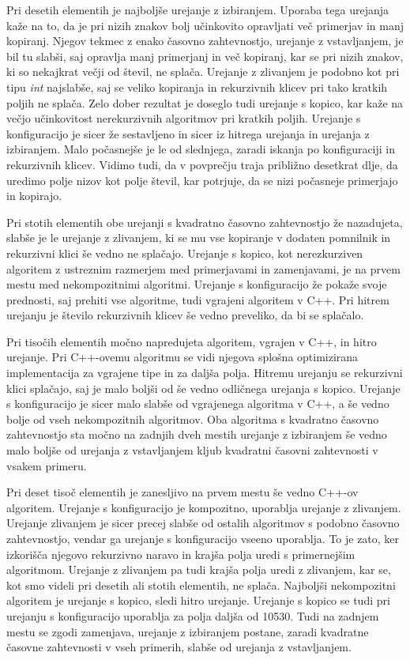 \documentclass[a4paper,oneside,12pt]{article}
\begin{document}
Pri desetih elementih je najboljše urejanje z izbiranjem.
Uporaba tega urejanja kaže na to, da je pri nizih znakov bolj učinkovito opravljati več
primerjav in manj kopiranj. Njegov tekmec z enako časovno zahtevnostjo, urejanje z 
vstavljanjem, je bil tu slabši, saj opravlja manj primerjanj in več kopiranj, kar se pri
nizih znakov, ki so nekajkrat večji od števil, ne splača. Urejanje z zlivanjem je podobno
kot pri tipu \emph{int} najslabše, saj se veliko kopiranja in rekurzivnih klicev pri tako 
kratkih poljih ne splača. Zelo dober rezultat je doseglo tudi urejanje s kopico, kar kaže 
na večjo učinkovitost nerekurzivnih algoritmov pri kratkih poljih. Urejanje s konfiguracijo
je sicer že sestavljeno in sicer iz hitrega urejanja in urejanja z izbiranjem. Malo počasnejše 
je le od slednjega, zaradi iskanja po konfiguraciji in rekurzivnih klicev.
Vidimo tudi, da v povprečju traja približno desetkrat dlje, da uredimo polje nizov kot polje števil,
kar potrjuje, da se nizi počasneje primerjajo in kopirajo.

Pri stotih elementih obe urejanji s kvadratno časovno zahtevnostjo že nazadujeta, slabše je le urejanje z zlivanjem,
ki se mu vse kopiranje v dodaten pomnilnik in rekurzivni klici 
še vedno ne splačajo. Urejanje s kopico, kot nerezkurziven algoritem
z ustreznim razmerjem med primerjavami in zamenjavami, je na prvem mestu med nekompozitnimi algoritmi.
Urejanje s konfiguracijo že pokaže svoje prednosti, saj prehiti vse algoritme, tudi vgrajeni 
algoritem v C++. Pri hitrem urejanju je število rekurzivnih klicev še vedno preveliko, da bi se splačalo.

Pri tisočih elementih močno napredujeta algoritem, vgrajen v C++, in hitro urejanje. Pri C++-ovemu algoritmu
se vidi njegova splošna optimizirana implementacija za vgrajene tipe in za daljša polja. Hitremu urejanju se 
rekurzivni klici splačajo, saj je malo boljši od še vedno odličnega urejanja s kopico. Urejanje s konfiguracijo 
je sicer malo slabše od vgrajenega algoritma v C++, a še vedno bolje od vseh nekompozitnih algoritmov.
Oba algoritma s kvadratno časovno zahtevnostjo sta močno na zadnjih dveh mestih urejanje z izbiranjem 
še vedno malo boljše od urejanja z vstavljanjem kljub kvadratni časovni zahtevnosti v vsakem primeru.

Pri deset tisoč elementih je zanesljivo na prvem mestu še vedno C++-ov algoritem. Urejanje s 
konfiguracijo je kompozitno, uporablja urejanje z zlivanjem. Urejanje zlivanjem je sicer precej
slabše od ostalih algoritmov s podobno časovno zahtevnostjo, vendar ga urejanje s konfiguracijo 
vseeno uporablja. To je zato, ker izkorišča njegovo rekurzivno naravo in krajša polja uredi s
primernejšim algoritmom. Urejanje z zlivanjem pa tudi krajša polja uredi z zlivanjem, kar se, kot smo 
videli pri desetih ali stotih elementih, ne splača. Najboljši nekompozitni algoritem 
je urejanje s kopico, sledi hitro urejanje. Urejanje s kopico se tudi pri urejanju s konfiguracijo
uporablja za polja daljša od 10530. Tudi na zadnjem mestu se zgodi zamenjava, urejanje z izbiranjem
postane, zaradi kvadratne časovne zahtevnosti v vseh primerih, slabše od urejanja z vstavljanjem. %
\end{document}
